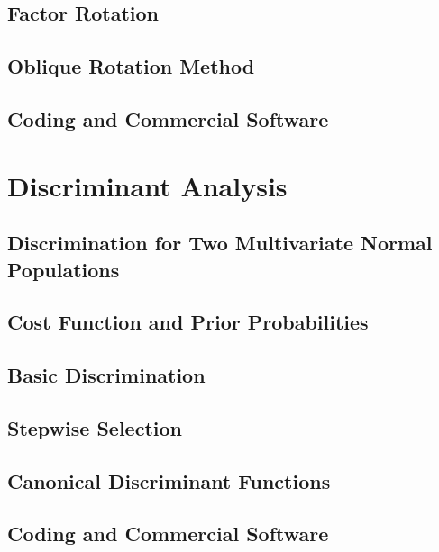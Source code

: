 \documentclass[12pt]{book}
\theoremstyle{definition}
\theoremstyle{remark}
\begin{document}
\section{Factor Rotation}

\section{Oblique Rotation Method}

\section{Coding and Commercial Software}

\chapter{Discriminant Analysis}

\section{Discrimination for Two Multivariate Normal Populations}

\section{Cost Function and Prior Probabilities}

\section{Basic Discrimination}

\section{Stepwise Selection}

\section{Canonical Discriminant Functions}

\section{Coding and Commercial Software}
\end{document}
